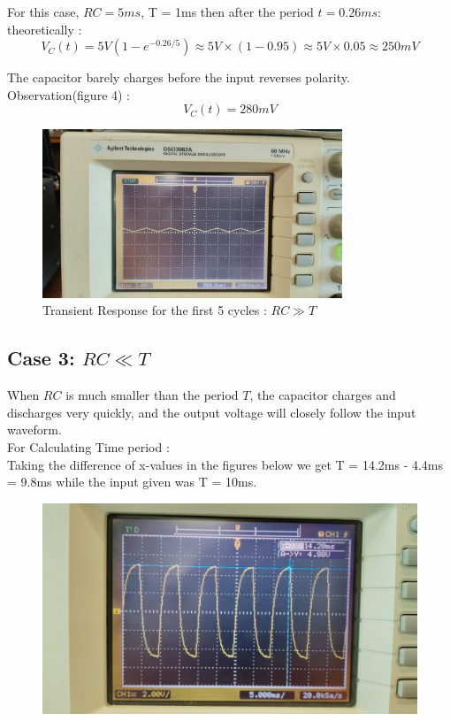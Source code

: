 \documentclass[a4paper,12pt]{article}
\begin{document}
For this case, \( RC = 5ms \), T = 1ms then after the period \( t = 0.26ms \):\\
theoretically :
\[
V_C\left(t\right) = 5V \left( 1 - e^{-0.26/5} \right) \approx 5V \times (1 - 0.95) \approx 5V \times 0.05 \approx 250mV
\]

The capacitor barely charges before the input reverses polarity.\\

Observation(figure 4) : \\
\[
V_C(t) = 280mV
\]

\begin{figure}[H]
    \centering
    \includegraphics[width=0.8\textwidth]{figs/rc>t_tr.jpeg}
    \caption{Transient Response for the first 5 cycles : \( RC \gg T \)}
\end{figure}

\subsection*{Case 3: \( RC \ll T \)}
When \( RC \) is much smaller than the period \( T \), the capacitor charges and discharges very quickly, and the output voltage will closely follow the input waveform.\\
For Calculating Time period :\\
Taking the difference of x-values in the figures below we get T = 14.2ms - 4.4ms = 9.8ms while the input given was T = 10ms.
\begin{figure}[H]
    \centering
    \includegraphics[width=\textwidth]{figs/rc<t_Time.jpeg}
\end{figure}
\end{document}

